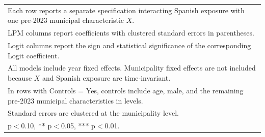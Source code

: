 \begin{table}[!htbp]
\begin{tabular}{lcccccr}
\multicolumn{7}{l}{\footnotesize Each row reports a separate specification interacting Spanish exposure with one pre-2023 municipal characteristic $X$.} \\
\multicolumn{7}{l}{\footnotesize LPM columns report coefficients with clustered standard errors in parentheses.} \\
\multicolumn{7}{l}{\footnotesize Logit columns report the sign and statistical significance of the corresponding Logit coefficient.} \\
\multicolumn{7}{l}{\footnotesize All models include year fixed effects. Municipality fixed effects are not included because $X$ and Spanish exposure are time-invariant.} \\
\multicolumn{7}{l}{\footnotesize In rows with Controls = Yes, controls include age, male, and the remaining pre-2023 municipal characteristics in levels.} \\
\multicolumn{7}{l}{\footnotesize Standard errors are clustered at the municipality level.} \\
\multicolumn{7}{l}{\footnotesize * p$<$0.10, ** p$<$0.05, *** p$<$0.01.} \\
\end{tabular}
\end{table}
